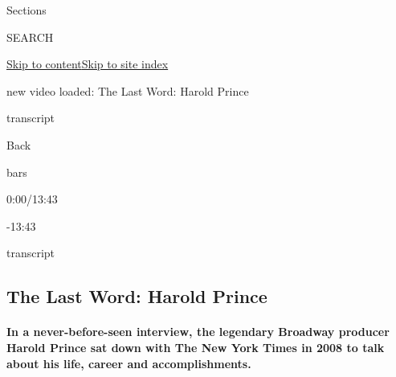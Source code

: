 Sections

SEARCH

\protect\hyperlink{site-content}{Skip to
content}\protect\hyperlink{site-index}{Skip to site index}

new video loaded: The Last Word: Harold Prince

transcript

Back

bars

0:00/13:43

-13:43

transcript

\hypertarget{the-last-word-harold-prince}{%
\subsection{The Last Word: Harold
Prince}\label{the-last-word-harold-prince}}

\hypertarget{in-a-never-before-seen-interview-the-legendary-broadway-producer-harold-prince-sat-down-with-the-new-york-times-in-2008-to-talk-about-his-life-career-and-accomplishments}{%
\paragraph{In a never-before-seen interview, the legendary Broadway
producer Harold Prince sat down with The New York Times in 2008 to talk
about his life, career and
accomplishments.}\label{in-a-never-before-seen-interview-the-legendary-broadway-producer-harold-prince-sat-down-with-the-new-york-times-in-2008-to-talk-about-his-life-career-and-accomplishments}}

